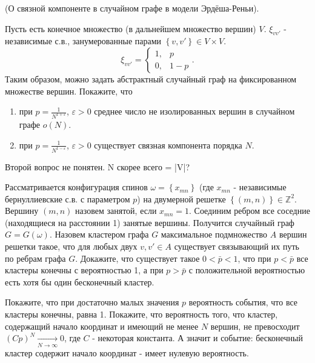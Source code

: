 \begin{problem}

(О связной компоненте в случайном графе в модели Эрдёша-Реньи).

 Пусть есть конечное множество (в дальнейшем множество вершин) $V$. $\xi _{vv'} $ - независимые с.в., занумерованные парами $\left\{v,v'\right\}\in V\times V$.
\[\xi _{vv'} =\left\{\begin{array}{cc} {1,} & {p} \\ {0,} & {1-p} \end{array}\right. .\] 
Таким образом, можно задать абстрактный случайный граф на фиксированном множестве вершин. Покажите, что 

\begin{enumerate}
\item  при $p=\frac{1}{N^{1+\varepsilon } } $, $\varepsilon >0$ среднее число не изолированных вершин в случайном графе $o\left(N\right)$.

\item  при $p=\frac{1}{N^{1-\varepsilon } } $, $\varepsilon >0$ существует связная компонента порядка $N$.
\end{enumerate}

\begin{fixme}
  Второй вопрос не понятен. N скорее всего = |V|?
\end{fixme}


\end{problem}

\begin{problem} 
Рассматривается конфигурация спинов $\omega =\left\{x_{mn} \right\}$ (где $x_{mn} $ - независимые бернуллиевские с.в. с параметром $p$) на двумерной решетке $\left\{(m,n)\right\}\in {\mathbb Z}^{2} $. Вершину $(m,n)$ назовем занятой, если $x_{mn} =1$. Соединим ребром все соседние (находящиеся на расстоянии 1) занятые вершины. Получится случайный граф $G=G\left(\omega \right)$. Назовем кластером графа $G$ максимальное подмножество $A$ вершин решетки такое, что для любых двух $v,v'\in A$ существует связывающий их путь по ребрам графа $G$. Докажите, что существует такое $0<\bar{p}<1$, что при $p<\bar{p}$ все кластеры конечны с вероятностью 1, а при $p>\bar{p}$ с положительной вероятностью есть хотя бы один бесконечный кластер.


\begin{ordre}
Покажите, что при достаточно малых значения $p$ вероятность события, что все кластеры конечны, равна 1. Покажите, что вероятность того, что кластер, содержащий начало координат и имеющий не менее $N$ вершин, не превосходит $\left(Cp\right)^{N} \mathop{\to }\limits_{N\to \infty } 0$, где $C$ - некоторая константа. А значит и событие: бесконечный кластер содержит начало координат - имеет нулевую вероятность.
\end{ordre}

\end{problem}


